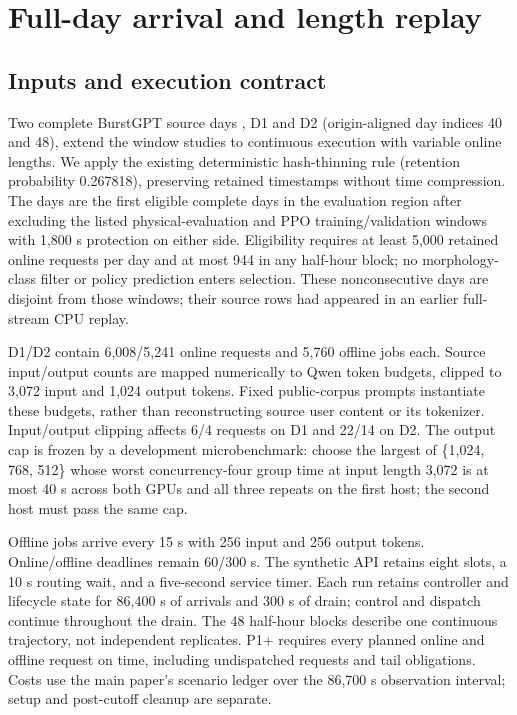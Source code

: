 













\section{Full-day arrival and length replay}
\label{sec:full-day-trace}

\subsection{Inputs and execution contract}
Two complete BurstGPT source days \citep{wang2024burstgpt}, D1 and D2
(origin-aligned day indices 40 and 48),
extend the window studies to continuous execution with variable online lengths.
We apply the existing deterministic hash-thinning rule (retention probability
0.267818), preserving retained timestamps without time compression.
The days are the first eligible complete days in the evaluation region after
excluding the listed physical-evaluation and PPO training/validation windows
with 1,800 s protection on either side. Eligibility requires at least 5,000
retained online requests per day and at most 944 in any half-hour block;
no morphology-class filter or policy prediction enters selection.
These nonconsecutive days are disjoint from those windows; their source rows
had appeared in an earlier full-stream CPU replay.

D1/D2 contain 6,008/5,241 online requests and 5,760 offline jobs each.
Source input/output counts are mapped numerically to Qwen token budgets,
clipped to 3,072 input and 1,024 output tokens. Fixed public-corpus prompts
instantiate these budgets, rather than reconstructing source user content
or its tokenizer. Input/output clipping affects 6/4 requests on D1 and
22/14 on D2. The output cap is frozen by a development microbenchmark:
choose the largest of \{1,024, 768, 512\} whose worst concurrency-four group
time at input length 3,072 is at most 40 s across both GPUs and all three
repeats on the first host; the second host must pass the same cap.

Offline jobs arrive every 15 s with 256 input and 256 output tokens.
Online/offline deadlines remain 60/300 s. The synthetic API retains eight
slots, a 10 s routing wait, and a five-second service timer.
Each run retains controller and lifecycle state for 86,400 s of arrivals
and 300 s of drain; control and dispatch continue throughout the drain.
The 48 half-hour blocks describe one continuous trajectory, not independent
replicates. P1+ requires every planned online and offline request on time,
including undispatched requests and tail obligations. Costs use the main
paper's scenario ledger over the 86,700 s observation interval; setup and
post-cutoff cleanup are separate.


